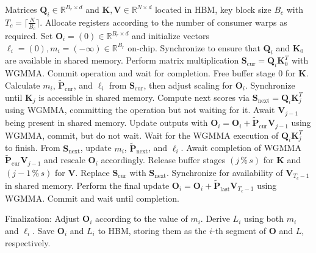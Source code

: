 \begin{algorithm}[H]
    \caption{\small\label{alg:flash3_wgmma}\textsc{FlashAttention-3} consumer warpgroup forward pass}
    \begin{algorithmic}[1]
      \REQUIRE  Matrices $\mathbf{Q}_i \in \mathbb{R}^{B_r \times d}$ and $\mathbf{K}, \mathbf{V} \in \mathbb{R}^{N \times d}$ located in HBM, key block size $B_c$ with $T_c = \lceil \frac{N}{B_c} \rceil$.
      \STATE Allocate registers according to the number of consumer warps as required.
      \STATE Set $\mathbf{O}_i = (0) \in \mathbb{R}^{B_r \times d}$ and initialize vectors $\ell_i = (0), m_i = (-\infty) \in \mathbb{R}^{B_r}$ on-chip.
      \STATE Synchronize to ensure that $\mathbf{Q}_i$ and $\mathbf{K}_0$ are available in shared memory.
      \STATE Perform matrix multiplication $\mathbf{S}_{\mathrm{cur}} = \mathbf{Q}_i \mathbf{K}_0^T$ with WGMMA. Commit operation and wait for completion.
      \STATE Free buffer stage 0 for $\mathbf{K}$.
      \STATE Calculate $m_{i}$, $\tilde{\mathbf{P}}_{\mathrm{cur}}$, and $\ell_{i}$ from $\mathbf{S}_{\mathrm{cur}}$, then adjust scaling for $\mathbf{O}_i$.
        \STATE Synchronize until $\mathbf{K}_j$ is accessible in shared memory.
        \label{code:mainloop_start}
        \STATE Compute next scores via $\mathbf{S}_{\mathrm{next}} = \mathbf{Q}_i \mathbf{K}_{j}^T$ using WGMMA, committing the operation but not waiting for it.
        \label{code:first_wgmma}
        \STATE Await $\mathbf{V}_{j-1}$ being present in shared memory.
        \STATE Update outputs with $\mathbf{O}_{i} = \mathbf{O}_{i} + \tilde{\mathbf{P}}_{\mathrm{cur}} \mathbf{V}_{j-1}$ using WGMMA, commit, but do not wait.
        \label{code:second_wgmma}
        \STATE Wait for the WGMMA execution of $\mathbf{Q}_i \mathbf{K}_{j}^T$ to finish.
        \STATE From $\mathbf{S}_{\mathrm{next}}$, update $m_{i}$, $\tilde{\mathbf{P}}_{\mathrm{next}}$, and $\ell_{i}$.
        \label{code:softmax}
        \STATE Await completion of WGMMA $\tilde{\mathbf{P}}_{\mathrm{cur}} \mathbf{V}_{j-1}$ and rescale $\mathbf{O}_i$ accordingly.
        \STATE Release buffer stages $(j\,\%\,s)$ for $\mathbf{K}$ and $(j-1\,\%\,s)$ for $\mathbf{V}$.
        \STATE Replace $\mathbf{S}_{\mathrm{cur}}$ with $\mathbf{S}_{\mathrm{next}}$.
        \label{code:mainloop_end}
      \ENDFOR \STATE Synchronize for availability of $\mathbf{V}_{T_c - 1}$ in shared memory.
      \STATE Perform the final update
      $\mathbf{O}_{i} = \mathbf{O}_{i} + \tilde{\mathbf{P}}_{\mathrm{last}} \mathbf{V}_{T_c - 1}$ using WGMMA. Commit and wait until completion.

\STATE Finalization: Adjust $\mathbf{O}_{i}$ according to the value of $m_{i}$. Derive $L_{i}$ using both $m_{i}$ and $\ell_{i}$.
Save $\mathbf{O}_{i}$ and $L_{i}$ to HBM, storing them as the $i$-th segment of $\mathbf{O}$ and $L$, respectively.
\end{algorithmic}
\end{algorithm}

